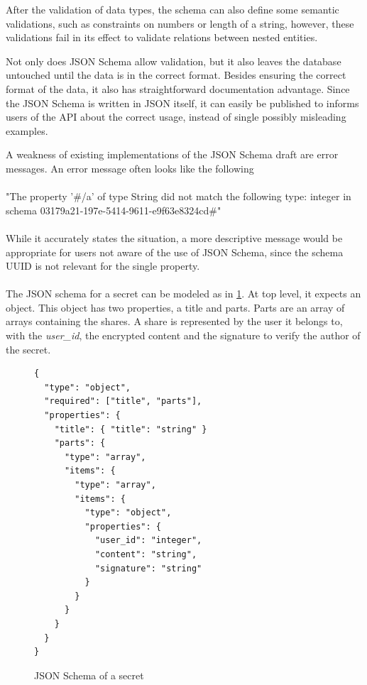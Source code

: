After the validation of data types, the schema can also define some semantic
validations, such as constraints on numbers or length of a string, however,
these validations fail in its effect to validate relations between nested
entities.

Not only does JSON Schema allow validation, but it also leaves the database
untouched until the data is in the correct format. Besides ensuring the correct
format of the data, it also has straightforward documentation advantage. Since
the JSON Schema is written in JSON itself, it can easily be published to
informs users of the API about the correct usage, instead of single possibly
misleading examples.

A weakness of existing implementations of the JSON Schema draft are error
messages. An error message often looks like the following

\paragraph{}{"The property '\#/a' of type String did not match the following type: integer in
schema 03179a21-197e-5414-9611-e9f63e8324cd\#"}

\paragraph{}{While it accurately states the situation, a more descriptive message would be
appropriate for users not aware of the use of JSON Schema, since the schema
UUID is not relevant for the single property.}

\paragraph{}{ 
  
  The JSON schema for a secret can be modeled as in
  \ref{code:secret_JSON_schema}. At top level, it expects an object. This
  object has two properties, a title and parts. Parts are an array of arrays
  containing the shares. A share is represented by the user it belongs to, with
  the \textit{user\_id}, the encrypted content and the signature to verify the
  author of the secret.

}

\begin{figure}
\begin{lstlisting}
{
  "type": "object",
  "required": ["title", "parts"],
  "properties": {
    "title": { "title": "string" }
    "parts": {
      "type": "array",
      "items": {
        "type": "array",
        "items": {
          "type": "object",
          "properties": {
            "user_id": "integer",
            "content": "string",
            "signature": "string"
          }
        }
      }
    }
  }
}
\end{lstlisting}
\caption{JSON Schema of a secret}
\label{code:secret_JSON_schema}
\end{figure}

